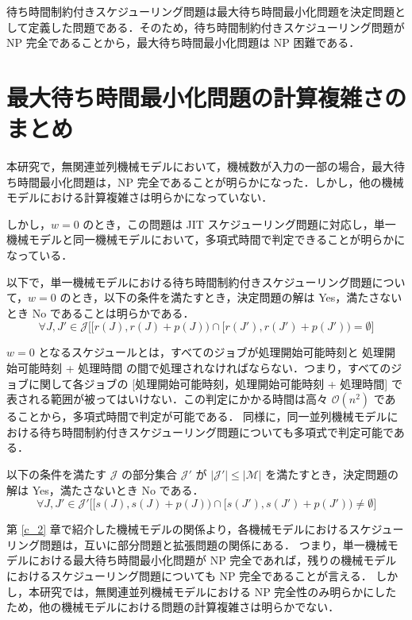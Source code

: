 \documentclass[12pt]{optlab-bachelor}
\begin{document}
待ち時間制約付きスケジューリング問題は最大待ち時間最小化問題を決定問題として定義した問題である．そのため，待ち時間制約付きスケジューリング問題が NP 完全であることから，最大待ち時間最小化問題は NP 困難である．

\section{最大待ち時間最小化問題の計算複雑さのまとめ}\label{4_s_2}
本研究で，無関連並列機械モデルにおいて，機械数が入力の一部の場合，最大待ち時間最小化問題は，NP 完全であることが明らかになった．しかし，他の機械モデルにおける計算複雑さは明らかになっていない．

しかし，$w = 0$ のとき，この問題は JIT スケジューリング問題に対応し，単一機械モデルと同一機械モデルにおいて，多項式時間で判定できることが明らかになっている．

以下で，単一機械モデルにおける待ち時間制約付きスケジューリング問題について，$w = 0$ のとき，以下の条件を満たすとき，決定問題の解は Yes，満たさないとき No であることは明らかである．
\begin{displaymath}
  \forall J,J' \in \mathcal{J}\bigg[\big[r(J),r(J) + p(J)\big) \cap \big[r(J'),r(J') + p(J')\big) = \emptyset\bigg]
\end{displaymath}

$w = 0$ となるスケジュールとは，すべてのジョブが処理開始可能時刻と 処理開始可能時刻 + 処理時間 の間で処理されなければならない．つまり，すべてのジョブに関して各ジョブの [処理開始可能時刻，処理開始可能時刻 + 処理時間] で表される範囲が被ってはいけない．この判定にかかる時間は高々 $\mathcal{O}(n^2)$ であることから，多項式時間で判定が可能である．
同様に，同一並列機械モデルにおける待ち時間制約付きスケジューリング問題についても多項式で判定可能である．

以下の条件を満たす $\mathcal{J}$ の部分集合 $\mathcal{J}'$ が $|\mathcal{J}'| \le |\mathcal{M}|$ を満たすとき，決定問題の解は Yes，満たさないとき No である．
\begin{displaymath}
  \forall J,J' \in \mathcal{J}'\bigg[\big[s(J),s(J) + p(J)\big) \cap \big[s(J'),s(J') + p(J')\big) \neq \emptyset\bigg]
\end{displaymath}

第 \ref{c_2} 章で紹介した機械モデルの関係より，各機械モデルにおけるスケジューリング問題は，互いに部分問題と拡張問題の関係にある．
つまり，単一機械モデルにおける最大待ち時間最小化問題が NP 完全であれば，残りの機械モデルにおけるスケジューリング問題についても NP 完全であることが言える．
しかし，本研究では，無関連並列機械モデルにおける NP 完全性のみ明らかにしたため，他の機械モデルにおける問題の計算複雑さは明らかでない．
\end{document}

